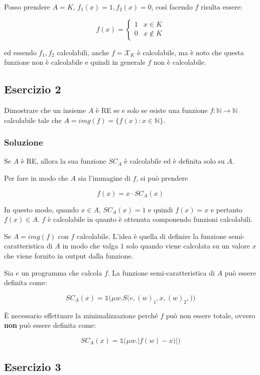 Posso prendere $A=K$, $f_1(x) = 1, f_2(x) = 0$, così facendo $f$ risulta essere:

$$
f(x) = \begin{cases}
1 & x \in K \\
0 & x \notin K
\end{cases}
$$

ed essendo $f_1, f_2$ calcolabili, anche $f = \mathcal{X}_K$ è calcolabile, ma è noto che questa funzione non è calcolabile e quindi in generale $f$ non è calcolabile.

\subsection{Esercizio 2}

Dimostrare che un insieme $A$ è RE se e solo se esiste una funzione $f : \mathbb{N} \rightarrow \mathbb{N}$ calcolabile tale che $A = img(f) = \{ f(x) : x \in \mathbb{N} \}$.

\subsubsection{Soluzione}

Se $A$ è RE, allora la sua funzione $SC_A$ è calcolabile ed è definita solo su $A$.

Per fare in modo che $A$ sia l'immagine di $f$, si può prendere

$$
f(x) = x \cdot SC_A(x)
$$

In questo modo, quando $x \in A$, $SC_A(x) = 1$ e quindi $f(x) = x$ e pertanto $f(x) \in A$.
$f$ è calcolabile in quanto è ottenuta componendo funzioni calcolabili.

Se $A = img(f)$ con $f$ calcolabile. L'idea è quella di definire la funzione semi-caratteristica di $A$ in modo che valga $1$ solo quando viene calcolata su un valore $x$ che viene fornito in output dalla funzione.

Sia $e$ un programma che calcola $f$. La funzione semi-caratteristica di $A$ può essere definita come:

$$
SC_A(x) = \mathbb{1}\bigg( \mu w. S \Big(e, (w)_1, x, (w)_2, \Big) \bigg)
$$

\`E necessario effettuare la minimalizzazione perché $f$ può non essere totale, ovvero \textbf{non} può essere definita come:

$$
SC_A(x) = \mathbb{1}\bigg( \mu w. |f(w) - x)| \bigg)
$$

\subsection{Esercizio 3}

